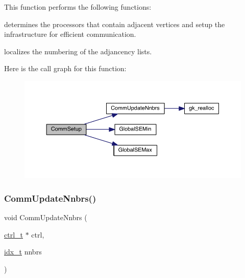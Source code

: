 This function performs the following functions\+:
\begin{DoxyItemize}
\item determines the processors that contain adjacent vertices and setup the infrastructure for efficient communication.
\item localizes the numbering of the adjancency lists. 
\end{DoxyItemize}Here is the call graph for this function\+:\nopagebreak
\begin{figure}[H]
\begin{center}
\leavevmode
\includegraphics[width=350pt]{a00344_ab7b157ae46e347049d624027324316a0_cgraph}
\end{center}
\end{figure}
\mbox{\label{a00344_a245110080c4fe1712c5cac4a52e61e69}} 
\subsubsection{\texorpdfstring{Comm\+Update\+Nnbrs()}{CommUpdateNnbrs()}}
{\footnotesize\ttfamily void Comm\+Update\+Nnbrs (\begin{DoxyParamCaption}\item[{\hyperlink{a00742}{ctrl\+\_\+t} $\ast$}]{ctrl,  }\item[{\hyperlink{a00876_aaa5262be3e700770163401acb0150f52}{idx\+\_\+t}}]{nnbrs }\end{DoxyParamCaption})}

